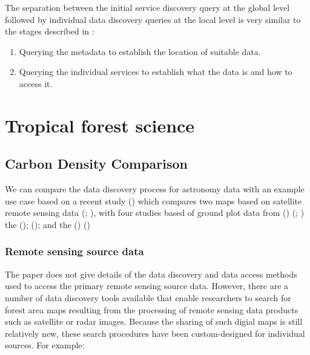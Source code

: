 \documentclass{article}
\begin{document}
The separation between the initial service discovery query at the global
level followed by individual data discovery queries at the local level is
very similar to the stages described in \cite{jones-2006}:
\begin{enumerate}
  \item Querying the metadata to establish the location of suitable data.
  \item Querying the individual services to establish what the data is and
  how to access it.
\end{enumerate}

\section{Tropical forest science}

\subsection{Carbon Density Comparison}

We can compare the \cite{vo} data discovery process for astronomy data with
an example use case based on a recent study
(\cite{mitchard-2014})
which compares two maps based on satellite remote sensing data
(\cite{saatchi-2011}; \cite{baccini-2012}),
with four studies based of ground plot data from
 (\cite{rainfor}) (\cite{peacock-2007}; \cite{malhi-2009})
the
 (\cite{atdn});
 (\cite{team});
and the
 (\cite{ppbio}) (\cite{pezzini-2012})

\subsubsection{Remote sensing source data}

The paper does not give details of the data discovery and data access methods
used to access the primary remote sensing source data. However, there are a
number of data discovery tools available that enable researchers to search
for forest area maps resulting from the processing of remote sensing data
products such as satellite or radar images.
Because the sharing of such digial maps is still relatively new, these search
procedures have been custom-designed for individual sources. For example:
\end{document}
